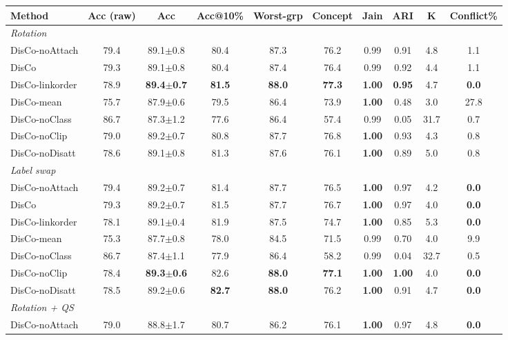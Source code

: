 \scriptsize
\setlength{\tabcolsep}{3.2pt}
\begin{tabular}{lccccccccc}
\toprule
Method & Acc (raw) & Acc & Acc@10\% & Worst-grp & Concept & Jain & ARI & K & Conflict\% \\
\midrule
\multicolumn{10}{l}{\textit{Rotation}}\\
DisCo-noAttach & 79.4 & 89.1$\pm$0.8 & 80.4 & 87.3 & 76.2 & 0.99 & 0.91 & 4.8 & 1.1 \\
DisCo & 79.3 & 89.1$\pm$0.8 & 80.4 & 87.4 & 76.4 & 0.99 & 0.92 & 4.4 & 1.1 \\
DisCo-linkorder & 78.9 & \textbf{89.4$\pm$0.7} & \textbf{81.5} & \textbf{88.0} & \textbf{77.3} & \textbf{1.00} & \textbf{0.95} & 4.7 & \textbf{0.0} \\
DisCo-mean & 75.7 & 87.9$\pm$0.6 & 79.5 & 86.4 & 73.9 & \textbf{1.00} & 0.48 & 3.0 & 27.8 \\
DisCo-noClass & 86.7 & 87.3$\pm$1.2 & 77.6 & 86.4 & 57.4 & 0.99 & 0.05 & 31.7 & 0.7 \\
DisCo-noClip & 79.0 & 89.2$\pm$0.7 & 80.8 & 87.7 & 76.8 & \textbf{1.00} & 0.93 & 4.3 & 0.8 \\
DisCo-noDisatt & 78.6 & 89.1$\pm$0.8 & 81.3 & 87.6 & 76.1 & \textbf{1.00} & 0.89 & 5.0 & 0.8 \\
\midrule
\multicolumn{10}{l}{\textit{Label swap}}\\
DisCo-noAttach & 79.4 & 89.2$\pm$0.7 & 81.4 & 87.7 & 76.5 & \textbf{1.00} & 0.97 & 4.2 & \textbf{0.0} \\
DisCo & 79.3 & 89.2$\pm$0.7 & 81.5 & 87.7 & 76.7 & \textbf{1.00} & 0.97 & 4.0 & \textbf{0.0} \\
DisCo-linkorder & 78.1 & 89.1$\pm$0.4 & 81.9 & 87.5 & 74.7 & \textbf{1.00} & 0.85 & 5.3 & \textbf{0.0} \\
DisCo-mean & 75.3 & 87.7$\pm$0.8 & 78.0 & 84.5 & 71.5 & 0.99 & 0.70 & 4.0 & 9.9 \\
DisCo-noClass & 86.7 & 87.4$\pm$1.1 & 77.9 & 86.4 & 58.2 & 0.99 & 0.04 & 32.7 & 0.5 \\
DisCo-noClip & 78.4 & \textbf{89.3$\pm$0.6} & 82.6 & \textbf{88.0} & \textbf{77.1} & \textbf{1.00} & \textbf{1.00} & 4.0 & \textbf{0.0} \\
DisCo-noDisatt & 78.5 & 89.2$\pm$0.6 & \textbf{82.7} & \textbf{88.0} & 76.2 & \textbf{1.00} & 0.91 & 4.7 & \textbf{0.0} \\
\midrule
\multicolumn{10}{l}{\textit{Rotation + QS}}\\
DisCo-noAttach & 79.0 & 88.8$\pm$1.7 & 80.7 & 86.2 & 76.1 & \textbf{1.00} & 0.97 & 4.8 & \textbf{0.0} \\

\end{tabular}
